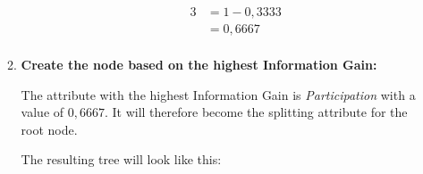 \documentclass[
english,
smallborders
]{i6prcsht}
\begin{document}
\begin{solution}
\begin{enumerate}
\begin{enumerate}
\begin{enumerate}
\begin{alignat*}{3}
					                                                     & = 1 - 0,3333                                                                                                                                                                                                                                      \\
					                                                     & = 0,6667                                                                                                                                                                                                                                          \\
				                  \end{alignat*}
			            \end{enumerate}
			            
			      \item \textbf{Create the node based on the highest Information Gain:}
			            
			            The attribute with the highest Information Gain is \textit{Participation} with a value of $0,6667$. It will therefore become the splitting attribute for the root node.
			            
			            The resulting tree will look like this:
			            
			            \begin{center}
\end{center}
\end{enumerate}
\end{enumerate}
\end{solution}
\end{document}
